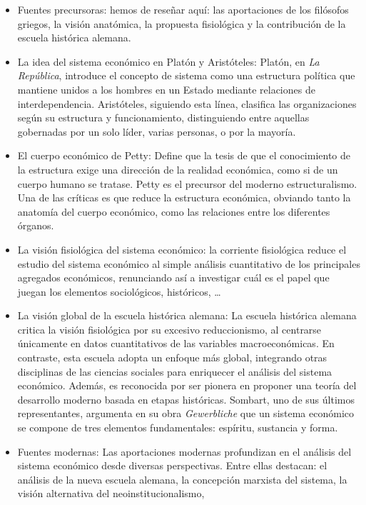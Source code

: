 \documentclass[12pt]{report} %
\begin{document}
\begin{itemize}
\item
  Fuentes precursoras: hemos de reseñar aquí: las aportaciones de los
  filósofos griegos, la visión anatómica, la propuesta fisiológica y la
  contribución de la escuela histórica alemana.
\item
  La idea del sistema económico en Platón y Aristóteles: Platón, en
  \emph{La República}, introduce el concepto de sistema como una
  estructura política que mantiene unidos a los hombres en un Estado
  mediante relaciones de interdependencia. Aristóteles, siguiendo esta
  línea, clasifica las organizaciones según su estructura y
  funcionamiento, distinguiendo entre aquellas gobernadas por un solo
  líder, varias personas, o por la mayoría.
\item
  El cuerpo económico de Petty: Define que la tesis de que el
  conocimiento de la estructura exige una dirección de la realidad
  económica, como si de un cuerpo humano se tratase. Petty es el
  precursor del moderno estructuralismo. Una de las críticas es que
  reduce la estructura económica, obviando tanto la anatomía del cuerpo
  económico, como las relaciones entre los diferentes órganos.
\item
  La visión fisiológica del sistema económico: la corriente fisiológica
  reduce el estudio del sistema económico al simple análisis
  cuantitativo de los principales agregados económicos, renunciando así
  a investigar cuál es el papel que juegan los elementos sociológicos,
  históricos, \ldots{}
\item
  La visión global de la escuela histórica alemana: La escuela histórica
  alemana critica la visión fisiológica por su excesivo reduccionismo,
  al centrarse únicamente en datos cuantitativos de las variables
  macroeconómicas. En contraste, esta escuela adopta un enfoque más
  global, integrando otras disciplinas de las ciencias sociales para
  enriquecer el análisis del sistema económico. Además, es reconocida
  por ser pionera en proponer una teoría del desarrollo moderno basada
  en etapas históricas. Sombart, uno de sus últimos representantes,
  argumenta en su obra \emph{Gewerbliche} que un sistema económico se
  compone de tres elementos fundamentales: espíritu, sustancia y forma.
\item
  Fuentes modernas: Las aportaciones modernas profundizan en el análisis
  del sistema económico desde diversas perspectivas. Entre ellas
  destacan: el análisis de la nueva escuela alemana, la concepción
  marxista del sistema, la visión alternativa del neoinstitucionalismo,

\end{itemize}
\end{document}

